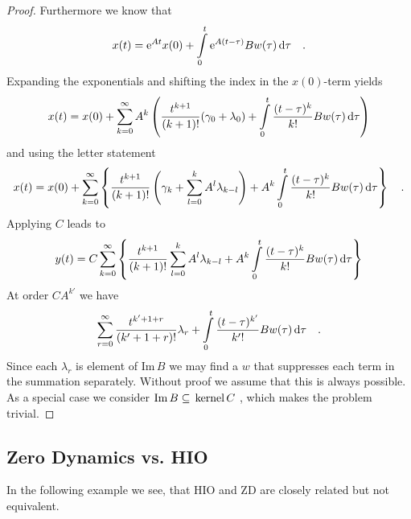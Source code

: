\begin{proof}
	Furthermore we know that
	\begin{equation}
	x(t) = \text{e}^{At}x(0) + \int\limits_{0}^t \text{e}^{A(t-\tau)} B w(\tau) \, \text{d} \tau 
	\quad .
	\end{equation}
	Expanding the exponentials and shifting the index in the $x(0)$-term yields
	\begin{equation}
	x(t) = x(0) + \sum\limits_{k=0}^\infty A^k \left( 
	\frac{t^{k+1}}{(k+1)!} (\gamma_0+\lambda_0) + \int\limits_0^t \frac{(t-\tau)^k}{k!}
	Bw(\tau) \, \text{d}\tau
	\right)
	\end{equation}
	and using the letter statement
	\begin{equation}
	x(t)=x(0) + \sum\limits_{k=0}^\infty 
	\left\{ \frac{t^{k+1}}{(k+1)!} 
	\left( \gamma_k
	+\sum\limits_{l=0}^k A^l\lambda_{k-l}
	\right) 
	+ A^k \int\limits_0^t \frac{(t-\tau)^k}{k!} Bw(\tau) \, \text{d} \tau
	\right\} \quad .
	\end{equation}
	Applying $C$ leads to
	\begin{equation}
	y(t) =C\sum\limits_{k=0}^\infty  \left\{ 
	\frac{t^{k+1}}{(k+1)!}
	\sum\limits_{l=0}^k A^l \lambda_{k-l} + A^k\int\limits_0^t 
	\frac{(t-\tau)^k}{k!} B w(\tau) \, \text{d} \tau
	\right\}
	\end{equation}
	At order $C A^{k'}$ we have
	\begin{equation}
	\sum\limits_{r=0}^\infty \frac{t^{k'+1+r}}{(k'+1+r)!} \lambda_{r} +
	\int\limits_0^t 
	\frac{(t-\tau)^{k'}}{k'!} B w(\tau) \, \text{d} \tau \quad .
	\end{equation}
	Since each $\lambda_r$ is element of $\text{Im}\,B$ we may find a 
	$w$ that suppresses each term in the summation separately. Without 
	proof we assume that this is always possible.\\
	As a special case we consider $\text{Im}\, B \subseteq  \, \text{kernel}\,C \,\,$, 
	which makes the problem trivial.
\end{proof}
	
\subsection{Zero Dynamics vs. HIO}
In the following example we see, that HIO and ZD are closely 
related but not equivalent.

